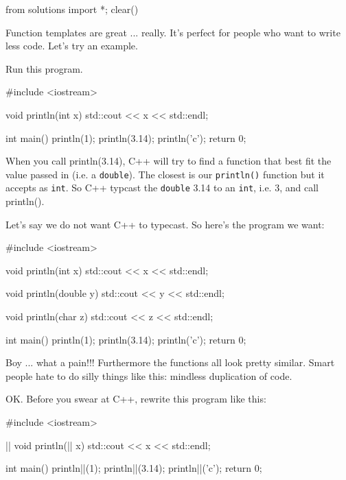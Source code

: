 \begin{python0}
from solutions import *; clear()
\end{python0}

Function templates are great ... really. It's perfect
for people who want to write less code. Let's try an
example.

Run this program.

\begin{consolethree}[escapeinside=||]
#include <iostream>

void println(int x)
{
    std::cout << x << std::endl;
}

int main()
{
    println(1);
    println(3.14);
    println('c');
    return 0;
}
\end{consolethree}

When you call println(3.14), C++ will try to find a function that best
fit the value passed in (i.e. a \texttt{double}). The closest is our
\texttt{println()} function but it accepts as \texttt{int}. So C++ typcast
the \texttt{double} 3.14 to an \texttt{int}, i.e. 3, and call println().

Let's say we do not want C++ to typecast. So
here's the program we want:

\begin{consolethree}[escapeinside=||]
#include <iostream>

void println(int x)
{
    std::cout << x << std::endl;
}

void println(double y)
{
    std::cout << y << std::endl;
}

void println(char z)
{
    std::cout << z << std::endl;
}

int main()
{
    println(1);
    println(3.14);
    println('c');
    return 0;
}
\end{consolethree}

Boy ... what a pain!!! Furthermore the functions all look pretty
similar. Smart people hate to do silly things like this: mindless
duplication of code.

OK. Before you swear at C++, rewrite this program like this:

\begin{consolethree}[escapeinside=||]
#include <iostream>

||
void println(|| x)
{
    std::cout << x << std::endl;
}

int main()
{
    println||(1);
    println||(3.14);
    println||('c');
    return 0;
}
\end{consolethree}

